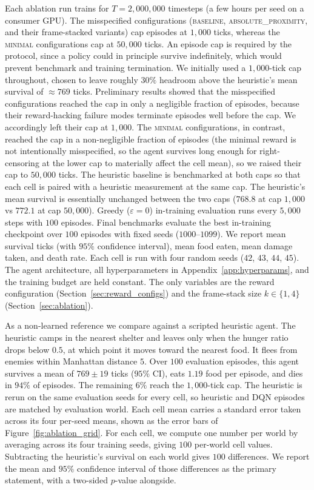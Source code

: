 \documentclass[12pt,a4paper,titlepage]{article}
\begin{document}
Each ablation run trains for $T = 2{,}000{,}000$ timesteps (a few hours per seed on a consumer GPU). The misspecified configurations (\textsc{baseline}, \textsc{absolute\_proximity}, and their frame-stacked variants) cap episodes at $1{,}000$ ticks, whereas the \textsc{minimal} configurations cap at $50{,}000$ ticks. An episode cap is required by the protocol, since a policy could in principle survive indefinitely, which would prevent benchmark and training termination. We initially used a $1{,}000$-tick cap throughout, chosen to leave roughly $30\%$ headroom above the heuristic's mean survival of $\approx 769$ ticks. Preliminary results showed that the misspecified configurations reached the cap in only a negligible fraction of episodes, because their reward-hacking failure modes terminate episodes well before the cap. We accordingly left their cap at $1{,}000$. The \textsc{minimal} configurations, in contrast, reached the cap in a non-negligible fraction of episodes (the minimal reward is not intentionally misspecified, so the agent survives long enough for right-censoring at the lower cap to materially affect the cell mean), so we raised their cap to $50{,}000$ ticks. The heuristic baseline is benchmarked at both caps so that each cell is paired with a heuristic measurement at the same cap. The heuristic's mean survival is essentially unchanged between the two caps ($768.8$ at cap $1{,}000$ vs $772.1$ at cap $50{,}000$). Greedy ($\varepsilon = 0$) in-training evaluation runs every $5{,}000$ steps with $100$ episodes. Final benchmarks evaluate the best in-training checkpoint over $100$ episodes with fixed seeds ($1000$--$1099$). We report mean survival ticks (with $95\%$ confidence interval), mean food eaten, mean damage taken, and death rate. Each cell is run with four random seeds ($42$, $43$, $44$, $45$). The agent architecture, all hyperparameters in Appendix~\ref{app:hyperparams}, and the training budget are held constant. The only variables are the reward configuration (Section~\ref{sec:reward_configs}) and the frame-stack size $k \in \{1, 4\}$ (Section~\ref{sec:ablation}).

As a non-learned reference we compare against a scripted heuristic agent. The heuristic camps in the nearest shelter and leaves only when the hunger ratio drops below $0.5$, at which point it moves toward the nearest food. It flees from enemies within Manhattan distance $5$. Over $100$ evaluation episodes, this agent survives a mean of $769 \pm 19$ ticks ($95\%$ CI), eats $1.19$ food per episode, and dies in $94\%$ of episodes. The remaining $6\%$ reach the $1{,}000$-tick cap. The heuristic is rerun on the same evaluation seeds for every cell, so heuristic and DQN episodes are matched by evaluation world. Each cell mean carries a standard error taken across its four per-seed means, shown as the error bars of Figure~\ref{fig:ablation_grid}. For each cell, we compute one number per world by averaging across its four training seeds, giving $100$ per-world cell values. Subtracting the heuristic's survival on each world gives $100$ differences. We report the mean and $95\%$ confidence interval of those differences as the primary statement, with a two-sided $p$-value alongside.
\end{document}
